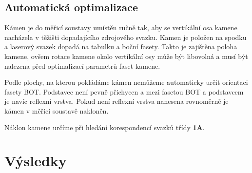 \newpage
\subsection{Automatická optimalizace}
Kámen je do měřicí soustavy umístěn ručně tak, aby se vertikální osa kamene nacházela v těžišti dopadajícího zdrojového svazku. Kamen je položen na spodku a laserový svazek dopadá na tabulku a boční fasety. Takto je zajištěna poloha kamene, ovšem rotace kamene okolo vertikální osy může být libovolná a musí být nalezena před optimalizací parametrů faset kamene. 

Podle plochy, na kterou pokládáme kámen nemůžeme automaticky určit orientaci fasety BOT. Podstavec není pevně přichycen a mezi fasetou BOT a podstavcem je navíc reflexní vrstva. Pokud není reflexní vrstva nanesena rovnoměrně je kámen v měřicí soustavě nakloněn.

Náklon kamene určíme při hledání korespondencí svazků třídy \textbf{1A}. 




\section{Výsledky}

\subsection{}

















 \clearpage